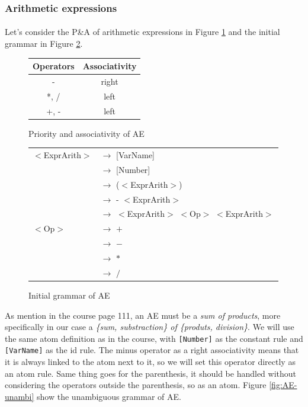 \documentclass[letterpaper]{article}
\begin{document}
\subsubsection{Arithmetic expressions}

\paragraph{}

Let's consider the P\&A of arithmetic expressions in Figure \ref{fig:AE-pa}
and the initial grammar in Figure \ref{fig:AE-initial}.

\begin{figure}[H]
    \centering
    \begin{tabular}{|c|c|}
        \hline
        Operators & Associativity \\
        \hline
        \hline
        - & right \\
        \hline
        *, / & left \\
        \hline
        +, - & left \\
        \hline
    \end{tabular}
    \caption{Priority and associativity of AE}
    \label{fig:AE-pa}
\end{figure}

\begin{figure}[H]
        \centering
        \begin{tabular}{l l}
            $<$ExprArith$>$ &$\rightarrow$ [VarName] \\
             &$\rightarrow$ [Number] \\
             &$\rightarrow$ ($<$ExprArith$>$) \\
             &$\rightarrow$ - $<$ExprArith$>$ \\
             &$\rightarrow$
            $<$ExprArith$>$ $<$Op$>$ $<$ExprArith$>$ \\
            $<$Op$>$ &$\rightarrow$ $+$ \\
             &$\rightarrow$ $-$ \\
             &$\rightarrow$ $*$ \\
             &$\rightarrow$ $/$ \\
        \end{tabular}
        \caption{Initial grammar of AE}
        \label{fig:AE-initial}
\end{figure}

As mention in the course page 111, an AE must be a \textit{sum of products},
more specifically in our case a \textit{\{sum, substraction\}
of \{produts, division\}}. We will use the same atom definition
 as in the course,
with \texttt{[Number]} as the constant rule and \texttt{[VarName]}
as the id rule.
The minus operator as a right associativity means that it is always linked
to the atom next to it, so we will set this operator directly as
an atom rule.
Same thing goes for the parenthesis, it should be handled without considering
the operators outside the parenthesis, so as an atom.
Figure \ref{fig:AE-unambi} show the unambiguous grammar of AE.
\end{document}
